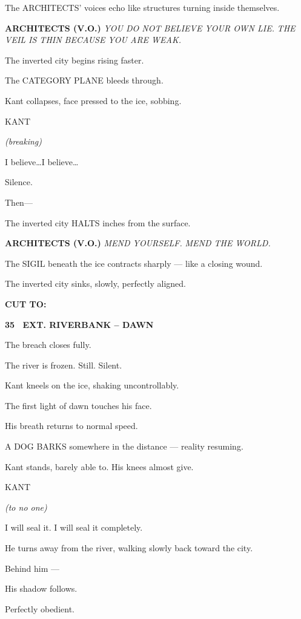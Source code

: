 \documentclass[12pt]{article}
\newcommand{\scene}[2]{%
  \vspace{1.8\baselineskip}%
  \noindent\textbf{#1 \ #2}\par\vspace{0.4\baselineskip}%
}
\newenvironment{dialogue}[1]{%
  \vspace{0.8\baselineskip}%
  \noindent\hspace*{2.3in}\textsc{#1}\par%
  \noindent\hspace*{1.5in}\begin{minipage}[t]{4.5in}%
}{%
  \end{minipage}\par%
}
\newcommand{\paren}[1]{%
  \noindent\hspace*{1.8in}\textit{(#1)}\par%
}
\newcommand{\transition}[1]{%
  \vspace{0.6\baselineskip}%
  \begin{flushright}\textbf{#1}\end{flushright}%
}
\begin{document}
The ARCHITECTS' voices echo like structures turning inside themselves.

\textbf{ARCHITECTS (V.O.)}  
\emph{YOU DO NOT BELIEVE YOUR OWN LIE.}  
\emph{THE VEIL IS THIN BECAUSE YOU ARE WEAK.}

The inverted city begins rising faster.

The CATEGORY PLANE bleeds through.

Kant collapses, face pressed to the ice, sobbing.

\begin{dialogue}{KANT}
\paren{breaking}
I believe\ldots I believe\ldots
\end{dialogue}

Silence.

Then—

The inverted city HALTS inches from the surface.

\textbf{ARCHITECTS (V.O.)}  
\emph{MEND YOURSELF.}  
\emph{MEND THE WORLD.}

The SIGIL beneath the ice contracts sharply — like a closing wound.

The inverted city sinks, slowly, perfectly aligned.

\transition{CUT TO:}


\scene{35}{EXT. RIVERBANK -- DAWN}

The breach closes fully.

The river is frozen. Still. Silent.

Kant kneels on the ice, shaking uncontrollably.

The first light of dawn touches his face.

His breath returns to normal speed.

A DOG BARKS somewhere in the distance — reality resuming.

Kant stands, barely able to. His knees almost give.

\begin{dialogue}{KANT}
\paren{to no one}
I will seal it.  
I will seal it completely.
\end{dialogue}

He turns away from the river, walking slowly back toward the city.

Behind him —

His shadow follows.

Perfectly obedient.
\end{document}
